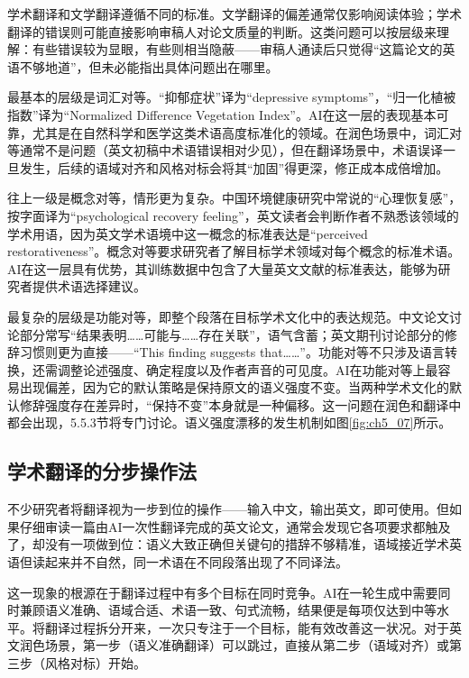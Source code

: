 学术翻译和文学翻译遵循不同的标准。文学翻译的偏差通常仅影响阅读体验；学术翻译的错误则可能直接影响审稿人对论文质量的判断。这类问题可以按层级来理解：有些错误较为显眼，有些则相当隐蔽——审稿人通读后只觉得``这篇论文的英语不够地道''，但未必能指出具体问题出在哪里。

最基本的层级是词汇对等。``抑郁症状''译为``depressive symptoms''，``归一化植被指数''译为``Normalized Difference Vegetation Index''。AI在这一层的表现基本可靠，尤其是在自然科学和医学这类术语高度标准化的领域。在润色场景中，词汇对等通常不是问题（英文初稿中术语错误相对少见），但在翻译场景中，术语误译一旦发生，后续的语域对齐和风格对标会将其``加固''得更深，修正成本成倍增加。

往上一级是概念对等，情形更为复杂。中国环境健康研究中常说的``心理恢复感''，按字面译为``psychological recovery feeling''，英文读者会判断作者不熟悉该领域的学术用语，因为英文学术语境中这一概念的标准表达是``perceived restorativeness''。概念对等要求研究者了解目标学术领域对每个概念的标准术语。AI在这一层具有优势，其训练数据中包含了大量英文文献的标准表达，能够为研究者提供术语选择建议。

最复杂的层级是功能对等，即整个段落在目标学术文化中的表达规范。中文论文讨论部分常写``结果表明……可能与……存在关联''，语气含蓄；英文期刊讨论部分的修辞习惯则更为直接——``This finding suggests that……''。功能对等不只涉及语言转换，还需调整论述强度、确定程度以及作者声音的可见度。AI在功能对等上最容易出现偏差，因为它的默认策略是保持原文的语义强度不变。当两种学术文化的默认修辞强度存在差异时，``保持不变''本身就是一种偏移。这一问题在润色和翻译中都会出现，5.5.3节将专门讨论。语义强度漂移的发生机制如图\ref{fig:ch5_07}所示。

\subsection{学术翻译的分步操作法}

不少研究者将翻译视为一步到位的操作——输入中文，输出英文，即可使用。但如果仔细审读一篇由AI一次性翻译完成的英文论文，通常会发现它各项要求都触及了，却没有一项做到位：语义大致正确但关键句的措辞不够精准，语域接近学术英语但读起来并不自然，同一术语在不同段落出现了不同译法。

这一现象的根源在于翻译过程中有多个目标在同时竞争。AI在一轮生成中需要同时兼顾语义准确、语域合适、术语一致、句式流畅，结果便是每项仅达到中等水平。将翻译过程拆分开来，一次只专注于一个目标，能有效改善这一状况。对于英文润色场景，第一步（语义准确翻译）可以跳过，直接从第二步（语域对齐）或第三步（风格对标）开始。

